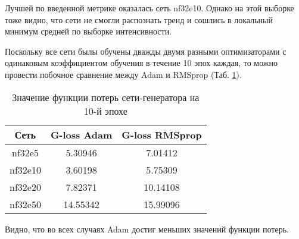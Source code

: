 			Лучшей по введенной метрике оказалась сеть nf32e10. Однако на этой выборке тоже видно, что сети не смогли распознать тренд и сошлись в локальный минимум средней по выборке интенсивности.
			
			Поскольку все сети былы обучены дважды двумя разными оптимизаторами с одинаковым коэффициентом обучения в течение 10 эпох каждая, то можно провести побочное сравнение между Adam и RMSprop (Таб. \ref{8-adam-rms}).
			
			\begin{table}[h!]
				\begin{center}
					\begin{tabular}{|c|c|c|}
						\hline
						Сеть & G-loss Adam & G-loss RMSprop \\
						\hline
						nf32e5 & 5.30946 & 7.01412\\
						\hline
						nf32e10 & 3.60198 & 5.75309\\
						\hline
						nf32e20 & 7.82371 & 10.14108\\
						\hline
						nf32e50 & 14.55342 & 15.99096\\
						\hline
					\end{tabular}
					\caption{Значение функции потерь сети-генератора на 10-й эпохе}
					\label{8-adam-rms}
				\end{center}
			\end{table}
			
			Видно, что во всех случаях Adam достиг меньших значений функции потерь.